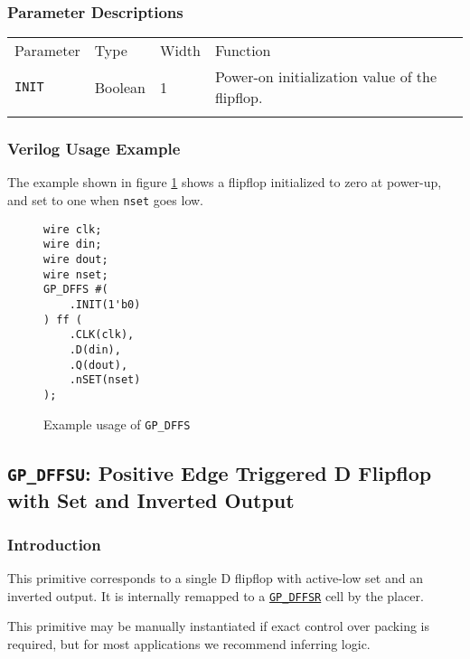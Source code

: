 \documentclass[11pt]{article}
\newcommand{\tokenstyle}[1]{\texttt{#1}}
\newcommand{\wirestyle}[1]{\texttt{#1}}
\newcommand{\whenstyle}[1]{{\fontseries{sb}\selectfont#1}}
\newcommand{\tokenref}[2]{\hyperref[#2]{\tokenstyle{#1}}}
\newcommand{\thinhline}{\Xhline{1\arrayrulewidth}}
\newcommand{\thickhline}{\Xhline{2.5\arrayrulewidth}}
\begin{document}
\subsubsection{Parameter Descriptions}

\begin{tabularx}{\textwidth}{lllX}
\thinhline
\whenstyle{Parameter} & \whenstyle{Type} & \whenstyle{Width} & \whenstyle{Function} \\
\thickhline
\tokenstyle{INIT} & Boolean & 1 & Power-on initialization value of the flipflop. \\
\thinhline
\end{tabularx}

\subsubsection{Verilog Usage Example}

The example shown in figure \ref{gp-dffs-example} shows a flipflop initialized to zero at power-up, and set to one
when \wirestyle{nset} goes low.

\begin{figure}[h]
\begin{lstlisting}
wire clk;
wire din;
wire dout;
wire nset;
GP_DFFS #(
	.INIT(1'b0)
) ff (
	.CLK(clk),
	.D(din),
	.Q(dout),
	.nSET(nset)
);
\end{lstlisting}
\caption{Example usage of \tokenstyle{GP\_DFFS}}
\label{gp-dffs-example}
\end{figure}


\pagebreak
\subsection{\tokenstyle{GP\_DFFSU}: Positive Edge Triggered D Flipflop with Set and Inverted Output}
\label{gp-dffs}

\subsubsection{Introduction}
This primitive corresponds to a single D flipflop with active-low set and an inverted output. It is internally remapped 
to a \tokenref{GP\_DFFSR}{gp-dffsr} cell by the placer.

This primitive may be manually instantiated if exact control over packing is required, but for most applications we
recommend inferring logic.
\end{document}
